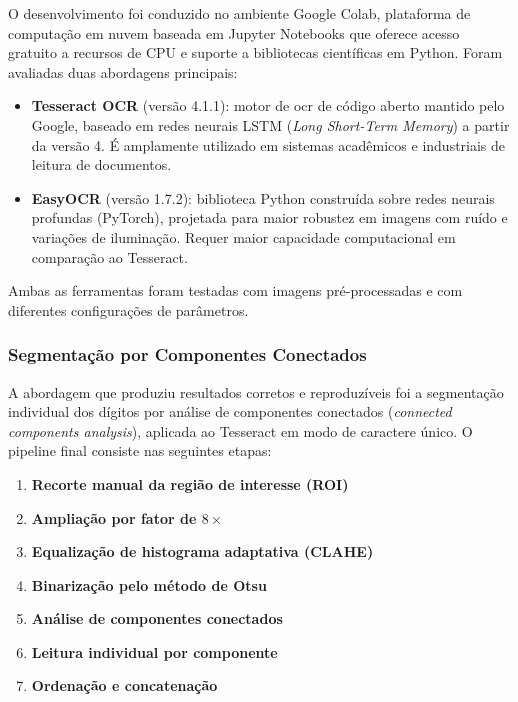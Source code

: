 O desenvolvimento foi conduzido no ambiente Google Colab, plataforma de computação em nuvem baseada em Jupyter Notebooks que oferece acesso gratuito a recursos de CPU e suporte a bibliotecas científicas em Python. Foram avaliadas duas abordagens principais:

\begin{itemize}
    \item \textbf{Tesseract OCR} (versão 4.1.1): motor de \gls{ocr} de código aberto mantido pelo Google, baseado em redes neurais LSTM (\textit{Long Short-Term Memory}) a partir da versão 4. É amplamente utilizado em sistemas acadêmicos e industriais de leitura de documentos.

    \item \textbf{EasyOCR} (versão 1.7.2): biblioteca Python construída sobre redes neurais profundas (PyTorch), projetada para maior robustez em imagens com ruído e variações de iluminação. Requer maior capacidade computacional em comparação ao Tesseract.
\end{itemize}

Ambas as ferramentas foram testadas com imagens pré-processadas e com diferentes configurações de parâmetros.

\subsubsection{Segmentação por Componentes Conectados}

A abordagem que produziu resultados corretos e reproduzíveis foi a segmentação individual dos dígitos por análise de componentes conectados (\textit{connected components analysis}), aplicada ao Tesseract em modo de caractere único. O pipeline final consiste nas seguintes etapas:

\begin{enumerate}
    \item \textbf{Recorte manual da região de interesse (ROI)} 

    \item \textbf{Ampliação por fator de $8\times$}

    \item \textbf{Equalização de histograma adaptativa (CLAHE)} 

    \item \textbf{Binarização pelo método de Otsu} 

    \item \textbf{Análise de componentes conectados} 

    \item \textbf{Leitura individual por componente} 

    \item \textbf{Ordenação e concatenação} 
\end{enumerate}

